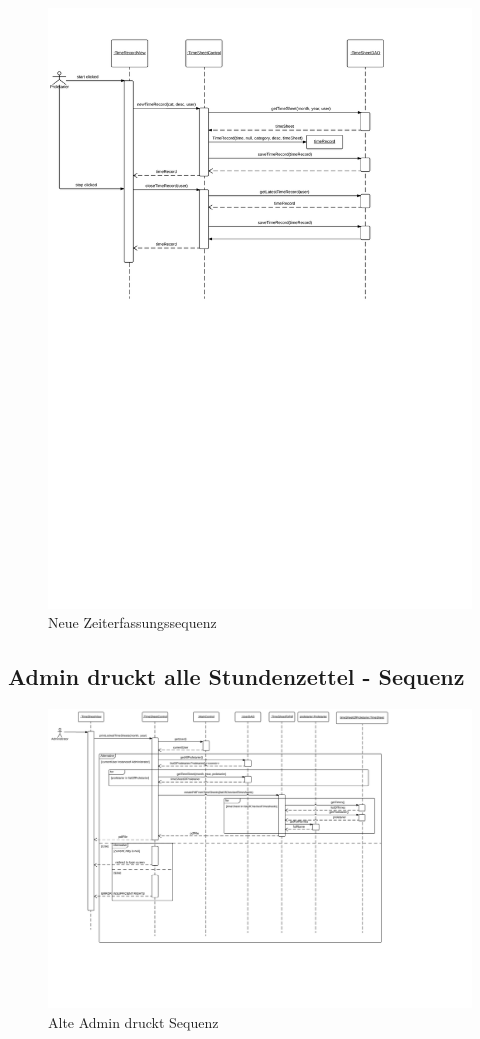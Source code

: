 \begin{figure}
  \centering
    \includegraphics[width=\linewidth]{new-Time-record-new.svg}
   \caption{Neue Zeiterfassungssequenz}
\end{figure}

\subsection{Admin druckt alle Stundenzettel - Sequenz}

\begin{figure}
  \centering
    \includegraphics[width=\linewidth]{Admin-prints-all-timesheets.svg}
   \caption{Alte Admin druckt Sequenz}
\end{figure}

